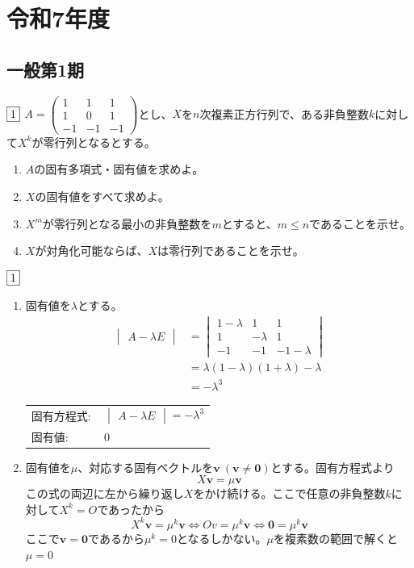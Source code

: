\documentclass[dvipdfmx]{jsreport}
\newcounter{num}[section]
\begin{document}
\chapter{令和7年度}
\section{ 一般第1期}
\begin{tcolorbox} %
	$\fbox{1}$ $A= \begin{pmatrix}1& 1& 1\\ 1& 0& 1\\ {-1}& {-1}& {-1}\end{pmatrix}$とし、$X$を$n$次複素正方行列で、ある非負整数$k$に対して$X^k$が零行列となるとする。
\begin{enumerate}
	\item $A$の固有多項式・固有値を求めよ。
	\item $X$の固有値をすべて求めよ。
	\item $X^m$が零行列となる最小の非負整数を$m$とすると、$m\le n$であることを示せ。
	\item $X$が対角化可能ならば、$X$は零行列であることを示せ。
\end{enumerate}
\end{tcolorbox}

\begin{answer} %
	$\fbox{1}$
\begin{enumerate}
	\item 固有値を$\lambda$とする。
\begin{align*}
	\begin{vmatrix}A- \lambda E\end{vmatrix}
&= 
\begin{vmatrix}
	1- \lambda& 1& 1\\
	1& -\lambda& 1\\
	-1& -1& -1- \lambda
\end{vmatrix}\\
&= \lambda(1- \lambda)(1+ \lambda)- \lambda\\
&= -\lambda^3
\end{align*}
\begin{tabular}{ll}
	固有方程式$\colon$& $\begin{vmatrix}A- \lambda E\end{vmatrix}= -\lambda^3$\\
	固有値$\colon$& 0
\end{tabular}

	\item 固有値を$\mu$、対応する固有ベクトルを$\bm{v}\ (\bm{v}\ne \bm{0})$とする。固有方程式より
\begin{equation*}
	X\bm{v} = \mu \bm{v}
\end{equation*}
	この式の両辺に左から繰り返し$X$をかけ続ける。ここで任意の非負整数$k$に対して$X^k= O$であったから
\begin{equation*}
	X^k\bm{v}= \mu^k \bm{v}\iff Ov= \mu^k \bm{v}\iff \bm{0}= \mu^k \bm{v}
\end{equation*}
	ここで$\bm{v}= \bm{0}$であるから$\mu^k= 0$となるしかない。$\mu$を複素数の範囲で解くと$\mu= 0$
\end{enumerate}
\end{answer}
\end{document}
